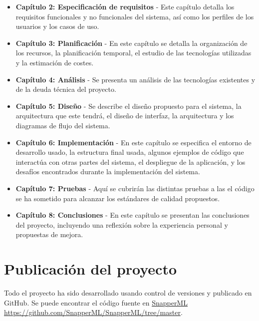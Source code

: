 \begin{itemize}
    \item \textbf{Capítulo 2: Especificación de requisitos} - Este capítulo detalla los requisitos funcionales y no funcionales del sistema, así como los perfiles de los usuarios y los casos de uso.
    \item \textbf{Capítulo 3: Planificación} - En este capítulo se detalla la organización de los recursos, la planificación temporal, el estudio de las tecnologías utilizadas y la estimación de costes.
    \item \textbf{Capítulo 4: Análisis} - Se presenta un análisis de las tecnologías existentes y de la deuda técnica del proyecto.
    \item \textbf{Capítulo 5: Diseño} - Se describe el diseño propuesto para el sistema, la arquitectura que este tendrá, el diseño de interfaz, la arquitectura y los diagramas de flujo del sistema.
    \item \textbf{Capítulo 6: Implementación} - En este capítulo se especifica el entorno de desarrollo usado, la estructura final usada, algunos ejemplos de código que interactúa con otras partes del sistema, el despliegue de la aplicación, y los desafíos encontrados durante la implementación del sistema.
    \item \textbf{Capítulo 7: Pruebas} - Aquí se cubrirán las distintas pruebas a las el código se ha sometido para alcanzar los estándares de calidad propuestos.
    \item \textbf{Capítulo 8: Conclusiones} - En este capítulo se presentan las conclusiones del proyecto, incluyendo una reflexión sobre la experiencia personal y propuestas de mejora.
\end{itemize}

\section{Publicación del proyecto}
Todo el proyecto ha sido desarrollado usando control de versiones y publicado en GitHub. Se puede encontrar el código fuente en \href{https://github.com/SnapperML/SnapperML/tree/master}{SnapperML}  \cite{snapperml}
\url{https://github.com/SnapperML/SnapperML/tree/master}.